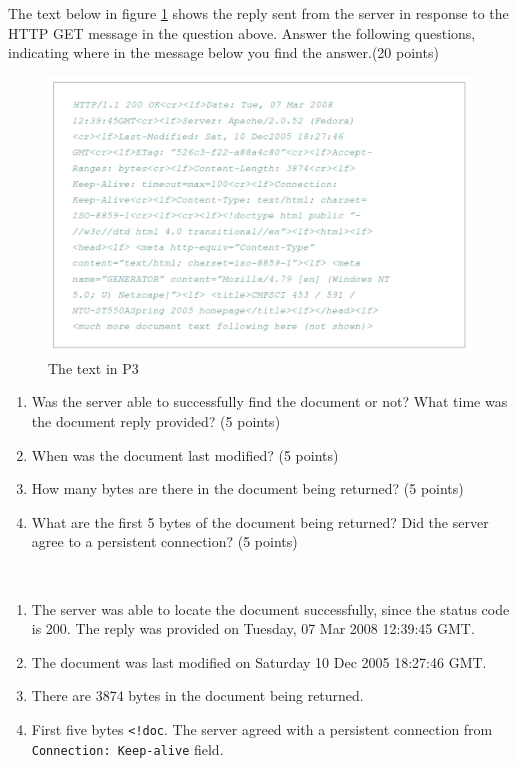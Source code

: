 \begin{exercise}[]{The text below in figure \ref{fig:1} shows the reply sent from the server in response to the HTTP GET message in the question above. Answer the following questions, indicating where in the message below you find the answer.(20 points)

    \begin{figure}[hb]
        \begin{center}
        \includegraphics[width=12cm]{img/ass2/hw2_1}
        \caption{The text in P3}
        \label{fig:1}
        \end{center}
      \end{figure}
    \begin{enumerate}
        \item Was the server able to successfully find the document or not? What time was the document reply provided? (5 points)
        \item When was the document last modified? (5 points)
        \item  How many bytes are there in the document being returned? (5 points)
        \item What are the first 5 bytes of the document being returned? Did the server agree to a persistent connection? (5 points)
    \end{enumerate}
    }
  \begin{solution}
  \par{~}
  \begin{enumerate}
      \item The server was able to locate the document successfully, since the status code is 200. The reply was provided on Tuesday, 07 Mar 2008 12:39:45 GMT.
      \item The document was last modified on Saturday 10 Dec 2005 18:27:46 GMT.
      \item There are 3874 bytes in the document being returned.
      \item First five bytes \texttt{<!doc}. The server agreed with a persistent connection from \texttt{Connection: Keep-alive} field.
  \end{enumerate}
  \end{solution}
  \label{ex3}
\end{exercise}



